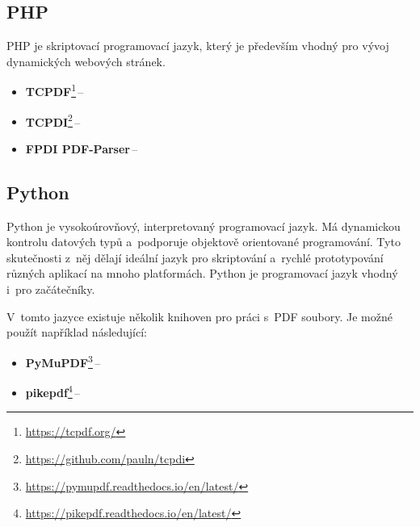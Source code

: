 \subsection*{PHP}

PHP je skriptovací programovací jazyk, který je především vhodný pro vývoj
dynamických webových stránek. 
\cite{PHP}

\dummyShortText[5]


\begin{itemize}
    \item \textbf{TCPDF}\footnote{\href{https://tcpdf.org/}{https://tcpdf.org/}}\,--\,\dummyText
    \item \textbf{TCPDI}\footnote{\href{https://github.com/pauln/tcpdi}{https://github.com/pauln/tcpdi}}\,--\,\dummyShortText[8]
    \item \textbf{FPDI PDF-Parser}\,--\,\dummyShortText[8]
\end{itemize}


\subsection*{Python}

Python je vysokoúrovňový, interpretovaný programovací jazyk. Má dynamickou
kontrolu datových typů a~podporuje objektově orientované programování. Tyto
skutečnosti z~něj dělají ideální jazyk pro skriptování a~rychlé prototypování
různých aplikací na mnoho platformách. Python je programovací jazyk vhodný i~pro
začátečníky.
\cite{Python}

V~tomto jazyce existuje několik knihoven pro práci s~PDF soubory. Je možné použít
například následující: 
\begin{itemize}
    \item \textbf{PyMuPDF}\footnote{\href{https://pymupdf.readthedocs.io/en/latest/}{https://pymupdf.readthedocs.io/en/latest/}}\,--\,\dummyText[2]
    \item \textbf{pikepdf}\footnote{\href{https://pikepdf.readthedocs.io/en/latest/}{https://pikepdf.readthedocs.io/en/latest/}}\,--\,\dummyShortText[8]
\end{itemize}






